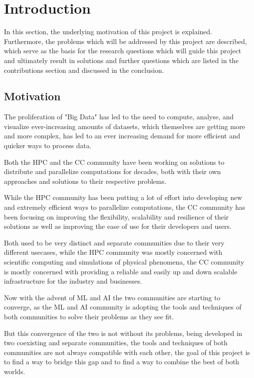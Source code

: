 \chapter{Introduction}
\label{Introduction}

In this section, the underlying motivation of this project is explained.
Furthermore, the problems which will be addressed by this project are described,
which serve as the basis for the research questions which will guide this project and ultimately
result in solutions and further questions which are listed in the contributions section and discussed in the conclusion.

\section{Motivation}
The proliferation of "Big Data" has led to the need to compute, analyse, and visualize ever-increasing amounts of datasets,
which themselves are getting more and more complex, has led to an ever increasing demand for more efficient and quicker ways to process data.

Both the \ac{HPC} and the \ac{CC} community have been working on solutions to distribute and parallelize computations for decades, 
both with their own approaches and solutions to their respective problems.

While the \ac{HPC} community has been putting a lot of effort into developing new and extremely efficient ways to parallelize computations,
the \ac{CC} community has been focusing on improving the flexibility, scalability and resilience of their solutions as well as improving the ease of use for their developers and users. 

Both used to be very distinct and separate communities due to their very different usecases, while the \ac{HPC} community was mostly concerned with scientific computing and simulations of physical phenomena,
the \ac{CC} community is mostly concerned with providing a reliable and easily up and down scalable infrastructure for the industry and businesses.

Now with the advent of \ac{ML} and \ac{AI} the two communities are starting to converge, 
as the \ac{ML} and \ac{AI} community is adopting the tools and techniques of both communities to solve their problems as they see fit.

But this convergence of the two is not without its problems, being developed in two coexisting and separate communities, the tools and techniques of both communities are not always compatible with each other,
the goal of this project is to find a way to bridge this gap and to find a way to combine the best of both worlds.

